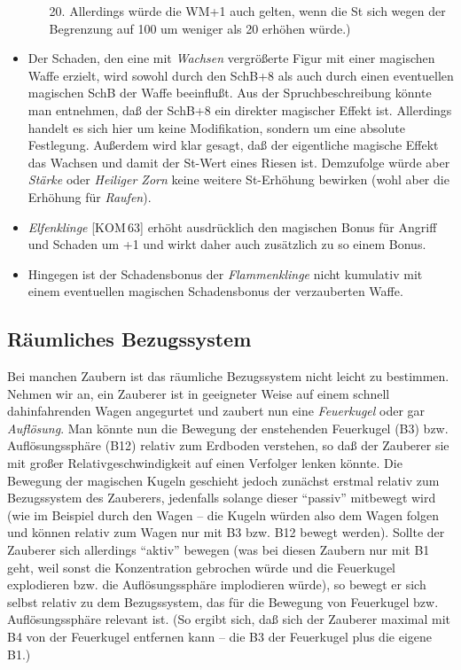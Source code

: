 \documentclass[10pt,a4paper,germanpar]{article}
\begin{document}
\begin{itemize}
\begin{itemize}
    20. Allerdings würde die WM+1 auch gelten, wenn die St sich wegen
    der Begrenzung auf 100 um weniger als 20 erhöhen würde.)
  \end{itemize}
\item Der Schaden, den eine mit \emph{Wachsen} vergrößerte Figur mit
  einer magischen Waffe erzielt, wird sowohl durch den SchB+8 als auch
  durch einen eventuellen magischen SchB der Waffe beeinflußt. Aus der
  Spruchbeschreibung könnte man entnehmen, daß der SchB+8 ein direkter
  magischer Effekt ist. Allerdings handelt es sich hier um keine
  Modifikation, sondern um eine absolute Festlegung. Außerdem wird
  klar gesagt, daß der eigentliche magische Effekt das Wachsen und
  damit der St-Wert eines Riesen ist. Demzufolge würde aber
  \emph{Stärke} oder \emph{Heiliger Zorn} keine weitere St-Erhöhung
  bewirken (wohl aber die Erhöhung für \emph{Raufen}).
\item \emph{Elfenklinge} [KOM\,63] erhöht ausdrücklich den magischen
  Bonus für Angriff und Schaden um +1 und wirkt daher auch zusätzlich
  zu so einem Bonus.
\item Hingegen ist der Schadensbonus der \emph{Flammenklinge} nicht
  kumulativ mit einem eventuellen magischen Schadensbonus der
  verzauberten Waffe.
\end{itemize}

\subsection{Räumliches Bezugssystem}

Bei manchen Zaubern ist das räumliche Bezugssystem nicht leicht zu
bestimmen. Nehmen wir an, ein Zauberer ist in geeigneter Weise auf
einem schnell dahinfahrenden Wagen angegurtet und zaubert nun eine
\emph{Feuerkugel} oder gar \emph{Auflösung}. Man könnte nun die
Bewegung der enstehenden Feuerkugel (B3) bzw. Auflösungssphäre (B12)
relativ zum Erdboden verstehen, so daß der Zauberer sie mit großer
Relativgeschwindigkeit auf einen Verfolger lenken könnte. Die Bewegung
der magischen Kugeln geschieht jedoch zunächst erstmal relativ zum
Bezugssystem des Zauberers, jedenfalls solange dieser "`passiv"'
mitbewegt wird (wie im Beispiel durch den Wagen -- die Kugeln würden
also dem Wagen folgen und können relativ zum Wagen nur mit B3 bzw. B12
bewegt werden). Sollte der Zauberer sich allerdings "`aktiv"' bewegen
(was bei diesen Zaubern nur mit B1 geht, weil sonst die Konzentration
gebrochen würde und die Feuerkugel explodieren bzw. die
Auflösungssphäre implodieren würde), so bewegt er sich selbst relativ
zu dem Bezugssystem, das für die Bewegung von Feuerkugel
bzw. Auflösungssphäre relevant ist. (So ergibt sich, daß sich der
Zauberer maximal mit B4 von der Feuerkugel entfernen kann -- die B3
der Feuerkugel plus die eigene B1.)
\end{document}
